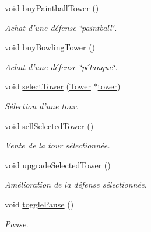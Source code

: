 \begin{DoxyCompactItemize}
void \hyperlink{classUI_a098f1fd7e42c754f82e6d68aba33cbd1}{buyPaintballTower} ()
\begin{DoxyCompactList}\small\item\em Achat d'une défense \char`\"{}paintball\char`\"{}. \end{DoxyCompactList}\item 
void \hyperlink{classUI_ad9cc9c903122ceca1d750555ec95dda7}{buyBowlingTower} ()
\begin{DoxyCompactList}\small\item\em Achat d'une défense \char`\"{}pétanque\char`\"{}. \end{DoxyCompactList}\item 
void \hyperlink{classUI_acc2450574743936721ad9d77b055d6d5}{selectTower} (\hyperlink{classTower}{Tower} $\ast$\hyperlink{classUI_a352f80a494c8d3c1723f1248438ea912}{tower})
\begin{DoxyCompactList}\small\item\em Sélection d'une tour. \end{DoxyCompactList}\item 
void \hyperlink{classUI_ad3666cc06e62117ba0ad65a1c3e6f1e5}{sellSelectedTower} ()
\begin{DoxyCompactList}\small\item\em Vente de la tour sélectionnée. \end{DoxyCompactList}\item 
void \hyperlink{classUI_a27f41a4f11f20308275dcb7638d25461}{upgradeSelectedTower} ()
\begin{DoxyCompactList}\small\item\em Amélioration de la défense sélectionnée. \end{DoxyCompactList}\item 
void \hyperlink{classUI_a0f9ae7742463929072d5a1f0203ebc69}{togglePause} ()
\begin{DoxyCompactList}\small\item\em Pause. \end{DoxyCompactList}\end{DoxyCompactItemize}
